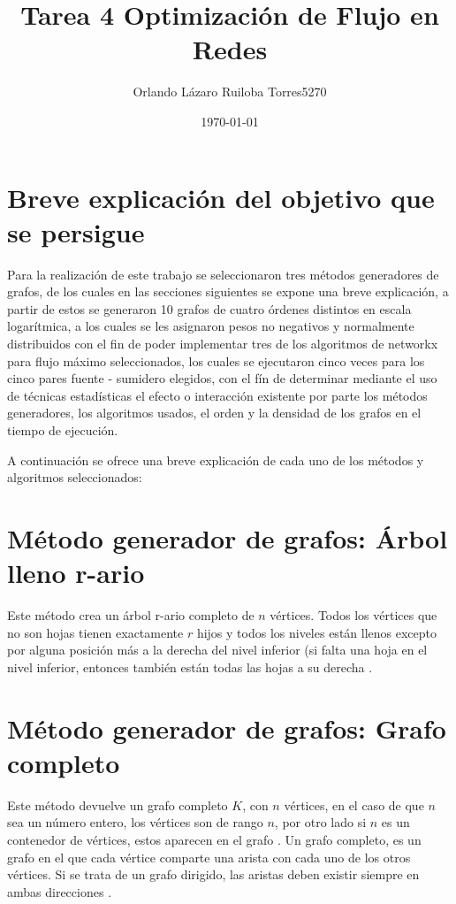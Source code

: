 \documentclass[10pt,a4paper]{article}
\author{Orlando Lázaro Ruiloba Torres\hspace{.4cm}5270}
\title{Tarea 4 Optimización de Flujo en Redes}
\date{\today}
\begin{document}
\maketitle

\section{Breve explicación del objetivo que se persigue}

Para la realización de este trabajo se seleccionaron tres métodos generadores de grafos, de los cuales en las secciones siguientes se expone una breve explicación, a partir de estos se generaron 10 grafos de cuatro órdenes distintos en escala logarítmica, a los cuales se les asignaron pesos no negativos y normalmente distribuidos con el fin de poder implementar tres de los algoritmos de networkx para flujo máximo seleccionados, los cuales se ejecutaron cinco veces para los cinco pares fuente - sumidero elegidos, con el fín de determinar mediante el uso de técnicas estadísticas el efecto o interacción existente por parte los métodos generadores, los algoritmos usados, el orden y la densidad de los grafos en el tiempo de ejecución.\vspace{.4cm} 

A continuación se ofrece una breve explicación de cada uno de los métodos y algoritmos seleccionados:

\section{Método generador de grafos: Árbol lleno r-ario}

Este método crea un árbol r-ario completo de $n$ vértices. Todos los vértices que no son hojas tienen exactamente $r$ hijos y todos los niveles están llenos excepto por alguna posición más a la derecha del nivel inferior (si falta una hoja en el nivel inferior, entonces también están todas las hojas a su derecha \cite{a1}.

\section{Método generador de grafos: Grafo completo}

Este método devuelve un grafo completo $K$, con $n$ vértices, en el caso de que $n$ sea un número entero, los vértices son de rango $n$, por otro lado si $n$ es un contenedor de vértices, estos aparecen en el grafo \cite{a2}. Un grafo completo, es un grafo en el que cada vértice comparte una arista con cada uno de los otros vértices. Si se trata de un grafo dirigido, las aristas deben existir siempre en ambas direcciones \cite{a3}.
\end{document}
